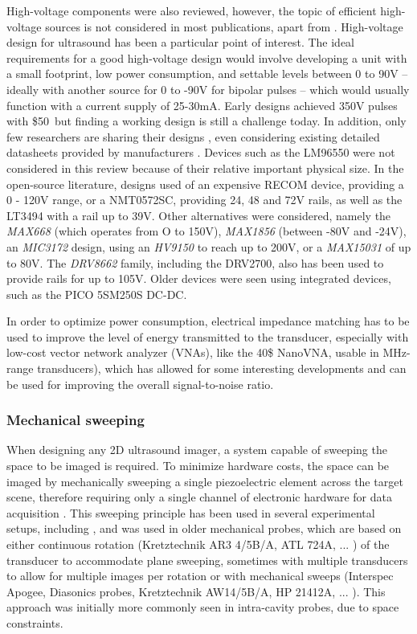 \documentclass{article}
\begin{document}
High-voltage components were also reviewed, however, the topic of efficient high-voltage sources is not considered in most publications, apart from \cite{xiao_design_2013}. High-voltage design for ultrasound has been a particular point of interest. The ideal requirements for a good high-voltage design would involve developing a unit with a small footprint, low power consumption, and settable levels between 0 to 90V -- ideally with another source for 0 to -90V for bipolar pulses -- which would usually function with a current supply of 25-30mA.  Early designs \cite{brown_low-cost_2002} achieved 350V pulses with \$50\, but finding a working design is still a challenge today. In addition, only few researchers are sharing their designs \cite{tang_computerized_2014}, even considering existing detailed datasheets provided by manufacturers \cite{granata_designing_2020}. Devices such as the LM96550 were not considered in this review because of their relative important physical size. In the open-source literature, designs  used of an expensive RECOM device, providing a 0 - 120V range, or a NMT0572SC, providing 24, 48 and 72V rails, as well as the LT3494 with a rail up to 39V. Other alternatives were considered, namely the \emph{MAX668} (which operates from O to 150V), \emph{MAX1856} (between -80V and -24V), an \emph{MIC3172} design, using an \emph{HV9150} to reach up to 200V, or a \emph{MAX15031} of up to 80V. The \emph{DRV8662} family, including the DRV2700, also has been used to provide rails for up to 105V. Older devices were seen using integrated devices, such as the PICO 5SM250S DC-DC. 

In order to optimize power consumption, electrical impedance matching \cite{rathod_review_2019} has to be used to improve the level of energy transmitted to the transducer, especially with low-cost vector network analyzer (VNAs), like the 40\$ NanoVNA, usable in MHz-range transducers), which has allowed for some interesting developments \cite{garcia-rodriguez_low_2010, wei_design_2020} and can be used for improving the overall signal-to-noise ratio.


\subsubsection{Mechanical sweeping}

When designing any 2D ultrasound imager, a system capable of sweeping the space to be imaged is required. To minimize hardware costs, the space can be imaged by mechanically sweeping a single piezoelectric element across the target scene, therefore requiring only a single channel of electronic hardware for data acquisition  \cite{saijo_development_nodate}. This sweeping principle has been used in several experimental setups, including \cite{chang_low-cost_2009}, and was used in older mechanical probes, which are based on either continuous rotation (Kretztechnik AR3 4/5B/A, ATL 724A, ... ) of the transducer to accommodate plane sweeping, sometimes with multiple transducers to allow for multiple images per rotation or with mechanical sweeps (Interspec Apogee, Diasonics probes, Kretztechnik AW14/5B/A, HP 21412A, ... ). This approach was initially more commonly seen in intra-cavity probes, due to space constraints. 
\end{document}
